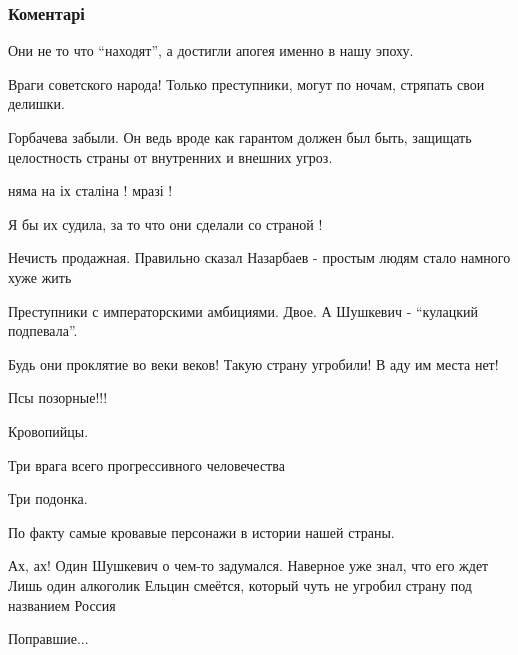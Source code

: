  
 
 
 
 
\subsubsection{Коментарі}
\label{sec:08_12_2021.fb.dudkin_jurij.1.belovezh_soglashenia.cmt}

\begin{itemize} %
Они не то что \enquote{находят}, а достигли апогея именно в нашу эпоху.

Враги советского народа! Только преступники, могут по ночам, стряпать свои делишки.

Горбачева забыли. Он ведь вроде как гарантом должен был быть, защищать целостность страны от внутренних и внешних угроз.

няма на іх сталіна ! мразі !

Я бы их судила, за то что они сделали со страной !

Нечисть продажная. Правильно сказал Назарбаев - простым людям стало намного хуже жить

Преступники с императорскими амбициями. Двое. А Шушкевич - \enquote{кулацкий подпевала}.

Будь они проклятие во веки веков! Такую страну угробили! В аду им места нет!

Псы позорные!!!

Кровопийцы.

Три врага всего прогрессивного человечества

Три подонка.

По факту самые кровавые персонажи в истории нашей страны.

Ах, ах! Один Шушкевич о чем-то задумался. Наверное уже знал, что его ждет
Лишь один алкоголик Ельцин смеётся, который чуть не угробил страну под названием Россия

Поправшие...


\end{itemize}
